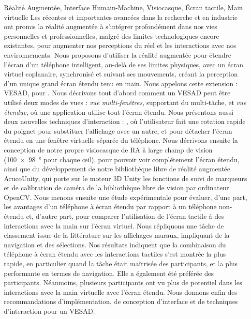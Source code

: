 \begin{sommaire}{Réalité Augmentée, Interface Humain-Machine, Visiocasque, Écran tactile, Main virtuelle}
  Les récentes et importantes avancées dans la recherche et en industrie ont promis la réalité augmentée à s'intégrer profondément dans nos vies personnelles et professionnelles, malgré des limites technologiques encore existantes, pour augmenter nos perceptions du réel et les interactions avec nos environnements.
  Nous proposons d'utiliser la réalité augmentée pour étendre l'écran d'un téléphone intelligent, au-delà de ses limites physiques, avec un écran virtuel coplanaire, synchronisé et suivant ses mouvements, créant la perception d'un unique grand écran étendu tenu en main. Nous appelons cette extension : VESAD, pour .
  Nous décrivons tout d'abord comment un VESAD peut être utilisé deux modes de vues : \emph{vue multi-fenêtres}, supportant du multi-tâche, et \emph{vue étendue}, où une application utilise tout l'écran étendu.
  Nous présentons aussi deux nouvelles techniques d'interaction : , où l'utilisateur fait une rotation rapide du poignet pour substituer l'affichage avec un autre, et  pour détacher l'écran étendu en une fenêtre virtuelle séparée du téléphone.
  Nous décrivons ensuite la conception de notre propre visiocasque de RA à large champ de vision (\SI{100x98}{\degree} pour chaque \oe il), pour pouvoir voir complétement l'écran étendu, ainsi que du développement de notre bibliothèque libre de réalité augmentée ArucoUnity, qui porte sur le moteur 3D Unity les fonctions de suivi de marqueurs et de calibration de caméra de la bibliothèque libre de vision par ordinateur OpenCV.
  Nous menons ensuite une étude expérimentale pour évaluer, d'une part, les avantages d'un téléphone à écran étendu par rapport à un téléphone non-étendu et, d'autre part, pour comparer l'utilisation de l'écran tactile à des interactions avec la main sur l'écran virtuel. Nous répliquons une tâche de classement issue de la littérature sur les affichages muraux, impliquant de la navigation et des sélections.
  Nos résultats indiquent que la combinaison du téléphone à écran étendu avec les interactions tactiles s'est montrée la plus rapide, en particulier quand la tâche était maîtrisée des participants, et la plus performante en termes de navigation. Elle a également été préférée des participants. Néanmoins, plusieurs participants ont vu plus de potentiel dans les interactions avec la main virtuelle avec l'écran étendu.
  Nous donnons enfin des recommandations d'implémentation, de conception d'interface et de techniques d'interaction pour un VESAD.
\end{sommaire}

